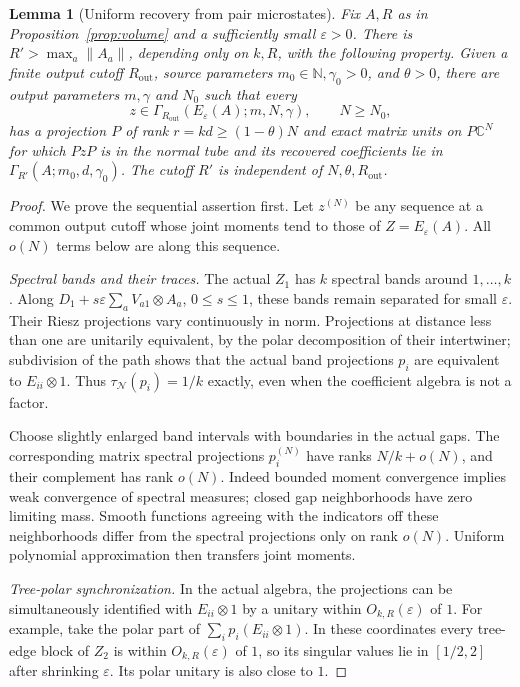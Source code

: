 \documentclass[11pt]{article}
\newtheorem{lemma}[theorem]{Lemma}
\theoremstyle{definition}\newtheorem{definition}[theorem]{Definition}
\theoremstyle{remark}\newtheorem{remark}[theorem]{Remark}
\newcommand{\C}{\mathbb C}\newcommand{\R}{\mathbb R}
\newcommand{\N}{\mathbb N}\newcommand{\sa}{\mathrm{sa}}
\newcommand{\eps}{\varepsilon}\newcommand{\id}{\mathrm{id}}
\begin{document}
\begin{lemma}[Uniform recovery from pair microstates]\label{lem:recovery}
Fix $A,R$ as in Proposition~\ref{prop:volume} and a sufficiently small
$\eps>0$. There is $R'>\max_a\|A_a\|$, depending only on $k,R$, with
the following property. Given a finite output cutoff $R_{\mathrm{out}}$,
source parameters $m_0\in\N,\gamma_0>0$, and $\theta>0$, there are
output parameters $m,\gamma$ and $N_0$ such that every
\[
 z\in\Gamma_{R_{\mathrm{out}}}(E_\eps(A);m,N,\gamma),\qquad N\geq N_0,
\]
has a projection $P$ of rank $r=kd\geq(1-\theta)N$ and exact matrix
units on $P\C^N$ for which $PzP$ is in the normal tube and its recovered
coefficients lie in $\Gamma_{R'}(A;m_0,d,\gamma_0)$.
The cutoff $R'$ is independent of $N,\theta,R_{\mathrm{out}}$.
\end{lemma}
\begin{proof}
We prove the sequential assertion first. Let $z^{(N)}$ be any sequence
at a common output cutoff whose joint moments tend to those of
$Z=E_\eps(A)$. All $o(N)$ terms below are along this sequence.

\emph{Spectral bands and their traces.}
The actual $Z_1$ has $k$ spectral bands around $1,\ldots,k$.
Along $D_1+s\eps\sum_aV_{a1}\otimes A_a$, $0\leq s\leq1$, these
bands remain separated for small $\eps$. Their Riesz projections vary
continuously in norm. Projections at distance less than one are
unitarily equivalent, by the polar decomposition of their intertwiner;
subdivision of the path shows that the actual band projections $p_i$
are equivalent to $E_{ii}\otimes1$. Thus
$\tau_{\mathcal N}(p_i)=1/k$ exactly, even when the coefficient algebra
is not a factor.

Choose slightly enlarged band intervals with boundaries in the actual
gaps. The corresponding matrix spectral projections $p_i^{(N)}$ have
ranks $N/k+o(N)$, and their complement has rank $o(N)$. Indeed bounded
moment convergence implies weak convergence of spectral measures;
closed gap neighborhoods have zero limiting mass. Smooth functions
agreeing with the indicators off these neighborhoods differ from the
spectral projections only on rank $o(N)$. Uniform polynomial
approximation then transfers joint moments.

\emph{Tree-polar synchronization.}
In the actual algebra, the projections can be simultaneously identified
with $E_{ii}\otimes1$ by a unitary within $O_{k,R}(\eps)$ of $1$.
For example, take the polar part of $\sum_i p_i(E_{ii}\otimes1)$.
In these coordinates every tree-edge block of $Z_2$ is within
$O_{k,R}(\eps)$ of $1$, so its singular values lie in $[1/2,2]$ after
shrinking $\eps$. Its polar unitary is also close to $1$.


\end{proof}
\end{document}
